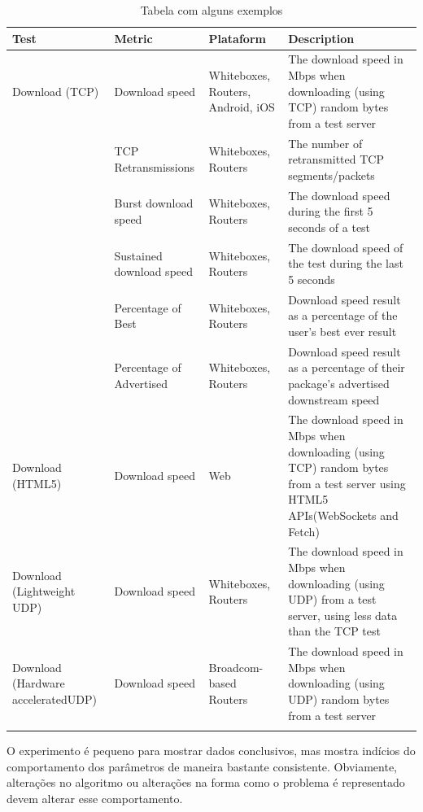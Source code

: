\documentclass{llncs}
\begin{document}
\begin{table}
\centering
\begin{longtable}{p{} p{} p{} p{}}
\label{tbl:2}


\\\textbf{Test} & \textbf{Metric} & \textbf{Plataform} & \textbf{Description}\\
\hline\hline
Download (TCP) & Download speed & Whiteboxes, Routers, Android, iOS & The download speed in Mbps when downloading (using TCP) random bytes from a test server \\ 
\hline 
  & TCP Retransmissions & Whiteboxes, Routers & The number of retransmitted TCP segments/packets \\ 
\hline
  & Burst download speed & Whiteboxes, Routers & The download speed during the first 5 seconds of a test \\ 
\hline 
  & Sustained download speed & Whiteboxes, Routers & The download speed of the test during the last 5 seconds \\ 
\hline 
  & Percentage of Best & Whiteboxes, Routers & Download speed result as a percentage of the user's best ever result \\ 
\hline 
  & Percentage of Advertised & Whiteboxes, Routers & Download speed result as a percentage of their package's advertised downstream speed \\ 
\hline 
Download (HTML5) & Download speed & Web & The download speed in Mbps when downloading (using TCP) random bytes from a test server using HTML5 APIs(WebSockets and Fetch) \\ 
\hline 
Download (Lightweight UDP) & Download speed & Whiteboxes, Routers & The download speed in Mbps when downloading (using UDP) from a test server, using less data than the TCP test \\ 
\hline 
Download (Hardware acceleratedUDP) & Download speed & Broadcom-based Routers & The download speed in Mbps when downloading (using UDP) random bytes from a test server \\
\hline 
\caption{Tabela com alguns exemplos}
\end{longtable}
\end{table}
%
%
\par O experimento é pequeno para mostrar dados conclusivos, mas mostra indícios do comportamento dos parâmetros de maneira bastante consistente. Obviamente, alterações no algoritmo ou alterações na forma como o problema é representado devem alterar esse comportamento.
\end{document}
